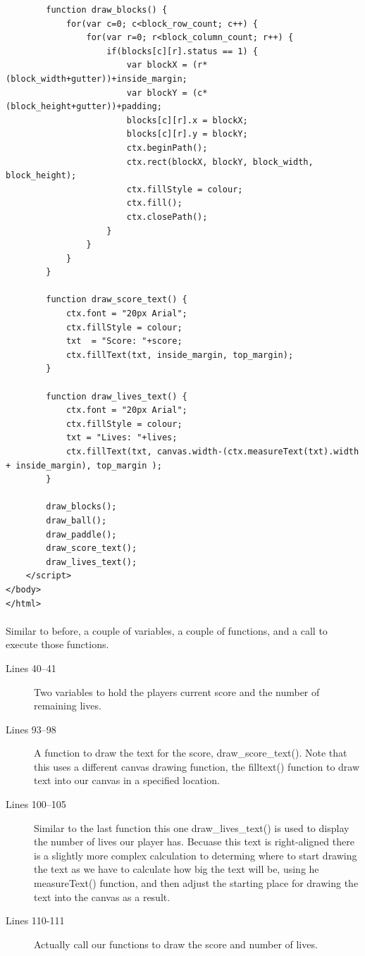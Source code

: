 \documentclass[10pt, a4paper, oneside]{article}
\begin{document}
\begin{lstlisting}
        function draw_blocks() {
            for(var c=0; c<block_row_count; c++) {
                for(var r=0; r<block_column_count; r++) {
                    if(blocks[c][r].status == 1) {
                        var blockX = (r*(block_width+gutter))+inside_margin;
                        var blockY = (c*(block_height+gutter))+padding;
                        blocks[c][r].x = blockX;
                        blocks[c][r].y = blockY;
                        ctx.beginPath();
                        ctx.rect(blockX, blockY, block_width, block_height);
                        ctx.fillStyle = colour;
                        ctx.fill();
                        ctx.closePath();
                    }
                }
            }
        }

        function draw_score_text() {
            ctx.font = "20px Arial";
            ctx.fillStyle = colour;
            txt  = "Score: "+score;
            ctx.fillText(txt, inside_margin, top_margin);
        }

        function draw_lives_text() {
            ctx.font = "20px Arial";
            ctx.fillStyle = colour;
            txt = "Lives: "+lives;
            ctx.fillText(txt, canvas.width-(ctx.measureText(txt).width + inside_margin), top_margin );
        }
       
        draw_blocks();
        draw_ball();
        draw_paddle();
        draw_score_text();
        draw_lives_text();
    </script>
</body>
</html>
\end{lstlisting}

\paragraph{} Similar to before, a couple of variables, a couple of functions, and a call to execute those functions.

\begin{description}
\item[Lines 40--41] Two variables to hold the players current score and the number of remaining lives.
\item[Lines 93--98] A function to draw the text for the score, draw\_score\_text(). Note that this uses a different canvas drawing function, the filltext() function to draw text into our canvas in a specified location.
\item[Lines 100--105] Similar to the last function this one draw\_lives\_text() is used to display the number of lives our player has. Becuase this text is right-aligned there is a slightly more complex calculation to determing where to start drawing the text as we have to calculate how big the text will be, using he measureText() function, and then adjust the starting place for drawing the text into the canvas as a result.
\item[Lines 110-111] Actually call our functions to draw the score and number of lives.
\end{description}
\end{document}
